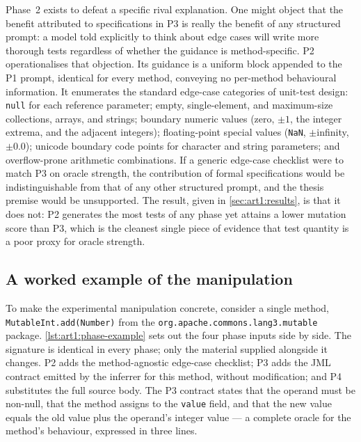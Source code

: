 Phase~2 exists to defeat a specific rival explanation. One might object that the
benefit attributed to specifications in P3 is really the benefit of any structured
prompt: a model told explicitly to think about edge cases will write more
thorough tests regardless of whether the guidance is method-specific. P2
operationalises that objection. Its guidance is a uniform block appended to the P1
prompt, identical for every method, conveying no per-method behavioural
information. It enumerates the standard edge-case categories of unit-test design:
\texttt{null} for each reference parameter; empty, single-element, and
maximum-size collections, arrays, and strings; boundary numeric values (zero,
$\pm 1$, the integer extrema, and the adjacent integers); floating-point special
values (\texttt{NaN}, $\pm$infinity, $\pm 0.0$); unicode boundary code points for
character and string parameters; and overflow-prone arithmetic combinations. If a
generic edge-case checklist were to match P3 on oracle strength, the contribution
of formal specifications would be indistinguishable from that of any other
structured prompt, and the thesis premise would be unsupported. The result, given
in \cref{sec:art1:results}, is that it does not: P2 generates the most tests of any
phase yet attains a lower mutation score than P3, which is the cleanest single
piece of evidence that test quantity is a poor proxy for oracle strength.

\subsection{A worked example of the manipulation}
\label{sec:art1:worked-example}

To make the experimental manipulation concrete, consider a single method,
\texttt{MutableInt.add(Number)} from the \texttt{org.apache.commons.lang3.mutable}
package. \cref{lst:art1:phase-example} sets out the four phase inputs side by
side. The signature is identical in every phase; only the material supplied
alongside it changes. P2 adds the method-agnostic edge-case checklist; P3 adds the
JML contract emitted by the inferrer for this method, without modification; and P4
substitutes the full source body. The P3 contract states that the operand must be
non-null, that the method assigns to the \texttt{value} field, and that the new
value equals the old value plus the operand's integer value --- a complete oracle
for the method's behaviour, expressed in three lines.

